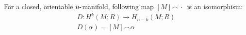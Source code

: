 \begin{definition}

For a closed, orientable \(n{\hbox{-}}\)manifold, following map
\([M] \frown {\,\cdot\,}\) is an isomorphism:
\begin{align*} D: H^k(M; R) \to H_{n-k}(M; R) \\ D(\alpha) = [M] \frown \alpha\end{align*}

\end{definition}

\begin{definition}

\end{definition}


\begin{definition}

\end{definition}


\begin{definition}[Pullback]

\end{definition}


\begin{definition}[Pushout]

\end{definition}


\begin{definition}

\end{definition}


\begin{definition}[R-orientability]

\end{definition}


\begin{definition}

\end{definition}


\begin{definition}

\end{definition}

